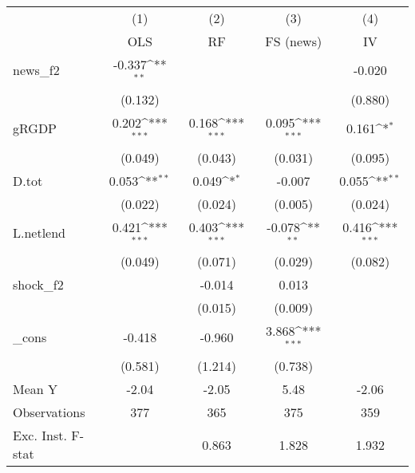 {
\def\sym#1{\ifmmode^{#1}\else\(^{#1}\)\fi}
\begin{tabular}{l*{4}{c}}
\toprule
            &\multicolumn{1}{c}{(1)}&\multicolumn{1}{c}{(2)}&\multicolumn{1}{c}{(3)}&\multicolumn{1}{c}{(4)}\\
            &\multicolumn{1}{c}{OLS}&\multicolumn{1}{c}{RF}&\multicolumn{1}{c}{FS (news)}&\multicolumn{1}{c}{IV}\\
\midrule
news\_f2     &      -0.337\sym{**} &                     &                     &      -0.020         \\
            &     (0.132)         &                     &                     &     (0.880)         \\
\addlinespace
gRGDP       &       0.202\sym{***}&       0.168\sym{***}&       0.095\sym{***}&       0.161\sym{*}  \\
            &     (0.049)         &     (0.043)         &     (0.031)         &     (0.095)         \\
\addlinespace
D.tot       &       0.053\sym{**} &       0.049\sym{*}  &      -0.007         &       0.055\sym{**} \\
            &     (0.022)         &     (0.024)         &     (0.005)         &     (0.024)         \\
\addlinespace
L.netlend   &       0.421\sym{***}&       0.403\sym{***}&      -0.078\sym{**} &       0.416\sym{***}\\
            &     (0.049)         &     (0.071)         &     (0.029)         &     (0.082)         \\
\addlinespace
shock\_f2    &                     &      -0.014         &       0.013         &                     \\
            &                     &     (0.015)         &     (0.009)         &                     \\
\addlinespace
\_cons      &      -0.418         &      -0.960         &       3.868\sym{***}&                     \\
            &     (0.581)         &     (1.214)         &     (0.738)         &                     \\
\midrule
Mean Y      &       -2.04         &       -2.05         &        5.48         &       -2.06         \\
Observations&         377         &         365         &         375         &         359         \\
Exc. Inst. F-stat&                     &       0.863         &       1.828         &       1.932         \\
\bottomrule
\end{tabular}
}
